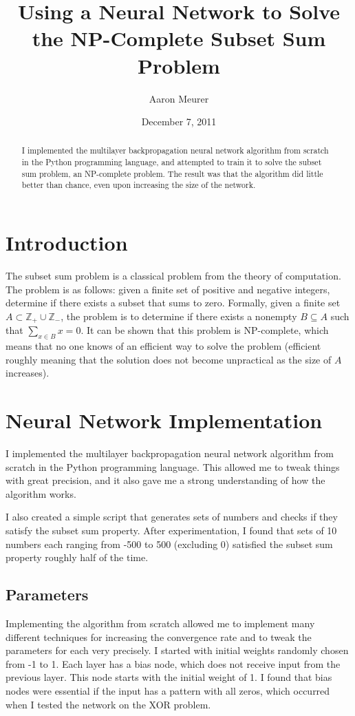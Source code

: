 \documentclass[12pt]{article}
\begin{document}
\title{Using a Neural Network to Solve the NP-Complete Subset Sum Problem}
\author{Aaron Meurer}
\date{December 7, 2011}
\maketitle

\begin{abstract}
I implemented the multilayer backpropagation neural network algorithm from scratch in the Python programming language, and attempted to train it to solve the subset sum problem, an NP-complete problem.  The result was that the algorithm did little better than chance, even upon increasing the size of the network.
\end{abstract}

\section{Introduction}
The subset sum problem is a classical problem from the theory of computation.  The problem is as follows: given a finite set of positive and negative integers, determine if there exists a subset that sums to zero.  Formally, given a finite set $A\subset \mathbb{Z}_+\cup\mathbb{Z}_-$, the problem is to determine if there exists a nonempty $B\subseteq A$ such that $\sum_{x\in B} x = 0$. It can be shown that this problem is NP-complete, which means that no one knows of an efficient way to solve the problem (efficient roughly meaning that the solution does not become unpractical as the size of $A$ increases).

\section{Neural Network Implementation}
I implemented the multilayer backpropagation neural network algorithm from scratch in the Python programming language.  This allowed me to tweak things with great precision, and it also gave me a strong understanding of how the algorithm works.

I also created a simple script that generates sets of numbers and checks if they satisfy the subset sum property.  After experimentation, I found that sets of 10 numbers each ranging from -500 to 500 (excluding 0) satisfied the subset sum property roughly half of the time.

\subsection{Parameters}
Implementing the algorithm from scratch allowed me to implement many different techniques for increasing the convergence rate and to tweak the parameters for each very precisely.  I started with initial weights randomly chosen from -1 to 1.  Each layer has a bias node, which does not receive input from the previous layer.  This node starts with the initial weight of 1. I found that bias nodes were essential if the input has a pattern with all zeros, which occurred when I tested the network on the XOR problem.
\end{document}
